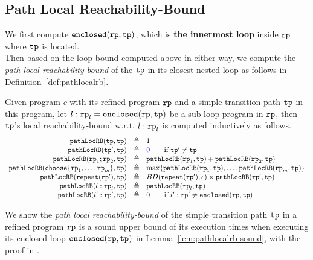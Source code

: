 \subsection{Path Local Reachability-Bound}
We first compute $\mathtt{enclosed}(\mathtt{rp}, \mathtt{tp})$, which is \textbf{the innermost loop} inside $\mathtt{rp}$ where $\mathtt{tp}$ is located.
\\
Then based on the loop bound computed above in either way, we compute the \emph{path local reachability-bound} of
the $\mathtt{tp}$ in its closest nested loop as follows in Definition~\ref{def:pathlocalrb}.
\begin{defn}
    \label{def:pathlocalrb}
    Given program $c$ with its refined program $\mathtt{rp}$ and a simple transition path $\mathtt{tp}$ in this program, 
    let $l: \mathtt{rp}_l = \mathtt{enclosed}(\mathtt{rp}, \mathtt{tp})$ be a sub loop program in $\mathtt{rp}$,
    then $\mathtt{tp}$'s local reachability-bound w.r.t. $l: \mathtt{rp}_l$
    is computed inductively as follows. 
  \[
    \begin{array}{rcl}
      \outinB(\tpath, \tpath) & \triangleq & 1 \\
      \outinB(\tpath', \tpath) & \triangleq & \highlight{0} \qquad \text{if } \tpath' \neq \tpath\\
      \outinB(\rprog_1;\rprog_2, \tpath) & \triangleq & \outinB(\rprog_1, \tpath) + \outinB(\rprog_2, \tpath) \\
      \outinB(\rpchoose{\rprog_1, \ldots, \rprog_m }, \tpath) & \triangleq 
      & \max\left\{ \outinB(\rprog_1, \tpath), \ldots, \outinB(\rprog_m, \tpath) \right\} \\
      \outinB(\rprepeat(\rprog'), \tpath) & \triangleq 
      & BD(\rprepeat(\rprog'), c) \times \outinB(\rprog', \tpath)
       \\
       \outinB(l: \rprog_l, \tpath) & \triangleq & \outinB(\rprog_l, \tpath) \\
       \outinB(l': \rprog', \tpath) & \triangleq & 0  \qquad \text{if } l': \rprog' \neq \kw{enclosed}(\rprog, \tpath)
    \end{array}
    \]
\end{defn}
We show the \emph{path local reachability-bound} of the simple transition path $\mathtt{tp}$ in a refined program $\mathtt{rp}$ is a sound upper bound of its execution times when executing its enclosed loop $\mathtt{enclosed}(\mathtt{rp}, \mathtt{tp})$ in Lemma~\ref{lem:pathlocalrb-sound}, with the proof in .
